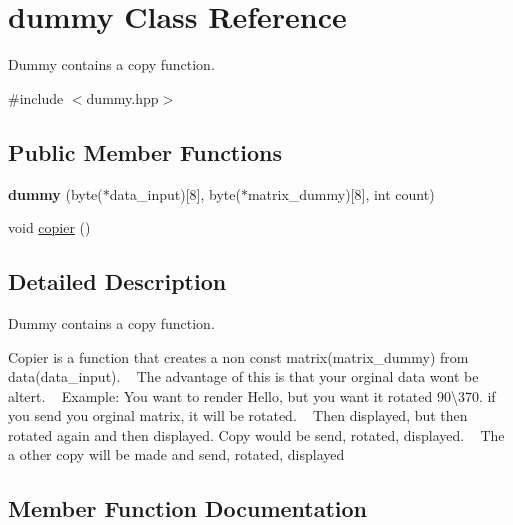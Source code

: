 \hypertarget{classdummy}{}\section{dummy Class Reference}
\label{classdummy}


Dummy contains a copy function.  




{\ttfamily \#include $<$dummy.\+hpp$>$}

\subsection*{Public Member Functions}
\begin{DoxyCompactItemize}
\item 
{\bfseries dummy} (byte($\ast$data\+\_\+input)\mbox{[}8\mbox{]}, byte($\ast$matrix\+\_\+dummy)\mbox{[}8\mbox{]}, int count)\hypertarget{classdummy_a73977fc0bcfacf1fd7438be2aa73684a}{}\label{classdummy_a73977fc0bcfacf1fd7438be2aa73684a}

\item 
void \hyperlink{classdummy_a6cfdc11e8b2c00ec0f929eb8b9c225d6}{copier} ()
\end{DoxyCompactItemize}


\subsection{Detailed Description}
Dummy contains a copy function. 

Copier is a function that creates a non const matrix(matrix\+\_\+dummy) from data(data\+\_\+input). ~\newline
The advantage of this is that your orginal data won\textquotesingle{}t be altert. ~\newline
Example\+: You want to render Hello, but you want it rotated 90\textbackslash{}370. if you send you orginal matrix, it will be rotated. ~\newline
Then displayed, but then rotated again and then displayed. Copy would be send, rotated, displayed. ~\newline
 The a other copy will be made and send, rotated, displayed 

\subsection{Member Function Documentation}
